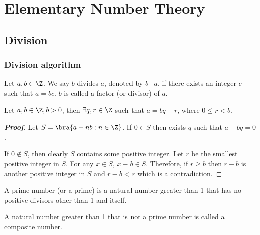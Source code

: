 \chapter{Elementary Number Theory}

\section{Division}

\subsection{Division algorithm}

\begin{definition}
Let $a,b\in \Z$. We say $b$ divides $a$, denoted by $b\mid a$, if there exists an integer $c$ such that $a = bc$. $b$ is called a factor (or divisor) of $a$.
\end{definition}

\begin{lemma}\label{lem:integer_division_remainder}
Let $a,b \in \Z, b>0$, then $\exists q,r \in \Z$ such that $a=bq+r$, where $0 \leq r <b$.
\end{lemma}

\begin{proof}[\bf Proof] 
Let $S =\bra{a - nb: n \in \Z}$. If $0\in S$ then exists $q$ such that $a-bq =0$. 

If $0\notin S$, then clearly $S$ contains some positive integer. Let $r$ be the smallest positive integer in $S$. For any $x\in S$, $x-b\in S$. Therefore, if $r\geq b$ then $r-b$ is another positive integer in $S$ and $r-b<r$ which is a contradiction.%
\end{proof}

\begin{definition}
A prime number (or a prime) is a natural number greater than 1 that has no positive divisors other than 1 and itself. 

A natural number greater than 1 that is not a prime number is called a composite number.
\end{definition}

